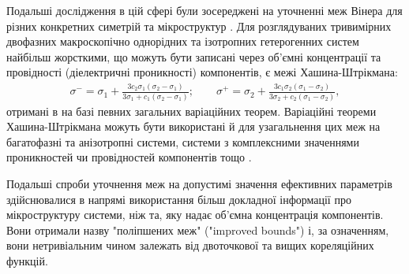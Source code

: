 \documentclass[14pt,twoside]{vakthesis}
\begin{document}
Подальші дослідження в цій сфері були зосереджені на уточненні меж Вінера для різних конкретних симетрій та мікроструктур \cite{Torquato,Sihvola1999,Milton}. Для розглядуваних тривимірних двофазних макроскопічно однорідних та ізотропних гетерогенних систем найбільш жорсткими, що можуть бути записані через об'ємні концентрації та провідності (діелектричні проникності)  компонентів, є межі Хашина-Штрікмана:
\begin{equation}\label{eq:HS-bounds}
	\begin{split}
	\sigma^{-} = \sigma_1 + \frac{3c_2 \sigma_1(\sigma_2-\sigma_1)}{3\sigma_1 + c_1(\sigma_2-\sigma_1)};\qquad
	\sigma^{+} = \sigma_2 + \frac{3c_1 \sigma_2(\sigma_1-\sigma_2)}{3\sigma_2 + c_2(\sigma_1-\sigma_2)},
	\end{split}
\end{equation}
отримані в \cite{HS1962} на базі певних загальних варіаційних теорем.
Варіаційні теореми Хашина-Штрікмана \cite{HS1962} можуть бути використані й для узагальнення цих меж на багатофазні та анізотропні системи, системи з комплексними значеннями проникностей чи провідностей компонентів тощо \cite{Torquato,Milton,Sihvola1999}. 

Подальші спроби уточнення меж на допустимі значення ефективних параметрів здійснювалися в напрямі використання більш докладної інформації про мікроструктуру системи, ніж та, яку надає об'ємна концентрація компонентів.  Вони отримали назву "поліпшених меж" ("improved bounds") \cite{Torquato,Sihvola1999} і, за означенням, вони нетривіальним чином залежать від двоточкової та вищих кореляційних функцій. 
\end{document}
